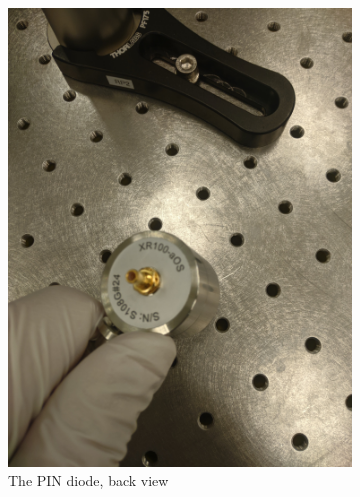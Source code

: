 \documentclass[a4paper, 10pt]{article}
\begin{document}
\begin{figure}[h]
\begin{subfigure}{0.4\textwidth}
        \includegraphics[width=\textwidth]{../images/pin-back.jpg}
        \caption{The PIN diode, back view}
        \label{fig:pin-diode}
    \end{subfigure}
    \begin{subfigure}{0.4\textwidth}
        \centering

\end{subfigure}
\end{figure}
\end{document}
